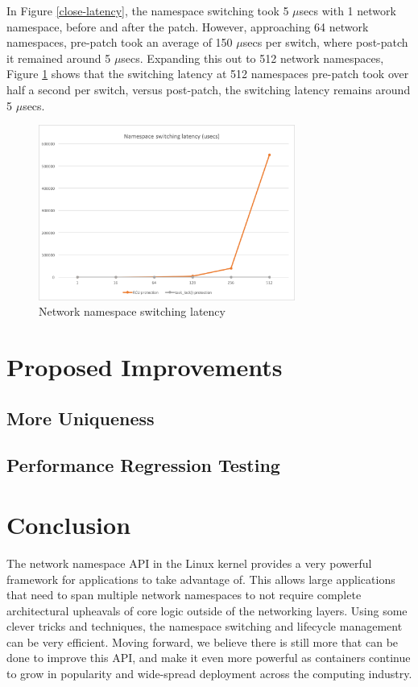 \documentclass[letterpaper]{article}
\begin{document}
In Figure \ref{close-latency}, the namespace switching took 5 $\mu$secs with 1 network namespace, before and after the patch. However, approaching 64 network namespaces, pre-patch took an average of 150 $\mu$secs per switch, where post-patch it remained around 5 $\mu$secs. Expanding this out to 512 network namespaces, Figure \ref{full-latency} shows that the switching latency at 512 namespaces pre-patch took over half a second per switch, versus post-patch, the switching latency remains around 5 $\mu$secs.

\begin{figure}[h]
\includegraphics[width=3.31in]{full-namespace-latency.png}
\caption{Network namespace switching latency}
\label{full-latency}
\end{figure}

\section{Proposed Improvements}

\subsection{More Uniqueness}

\subsection{Performance Regression Testing}

\section{Conclusion}
The network namespace API in the Linux kernel provides a very powerful framework for applications to take advantage of. This allows large applications that need to span multiple network namespaces to not require complete architectural upheavals of core logic outside of the networking layers. Using some clever tricks and techniques, the namespace switching and lifecycle management can be very efficient. Moving forward, we believe there is still more that can be done to improve this API, and make it even more powerful as containers continue to grow in popularity and wide-spread deployment across the computing industry.
\end{document}
